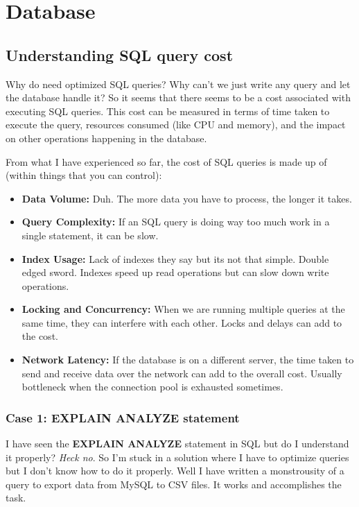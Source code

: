 \section{Database}
\subsection{Understanding SQL query cost}
Why do need optimized SQL queries? Why can't we just write any query and let the database handle it? So it seems that there seems to be a cost associated with executing SQL queries. This cost can be measured in terms of time taken to execute the query, resources consumed (like CPU and memory), and the impact on other operations happening in the database.


From what I have experienced so far, the cost of SQL queries is made up of (within things that you can control):
\begin{itemize}
    \item \textbf{Data Volume:} Duh. The more data you have to process, the longer it takes.
    \item \textbf{Query Complexity:} If an SQL query is doing way too much work in a single statement, it can be slow.
    \item \textbf{Index Usage:} Lack of indexes they say but its not that simple. Double edged sword. Indexes speed up read operations but can slow down write operations.
    \item \textbf{Locking and Concurrency:} When we are running multiple queries at the same time, they can interfere with each other. Locks and delays can add to the cost.
    \item \textbf{Network Latency:} If the database is on a different server, the time taken to send and receive data over the network can add to the overall cost. Usually bottleneck when the connection pool is exhausted sometimes.
\end{itemize}

\subsubsection{Case 1: EXPLAIN ANALYZE statement}
I have seen the \textbf{EXPLAIN ANALYZE} statement in SQL but do I understand it properly? \textit{Heck no}. So I'm stuck in a solution where I have to optimize queries but I don't know how to do it properly. Well I have written a monstrousity of a query to export data from MySQL to CSV files. It works and accomplishes the task.

